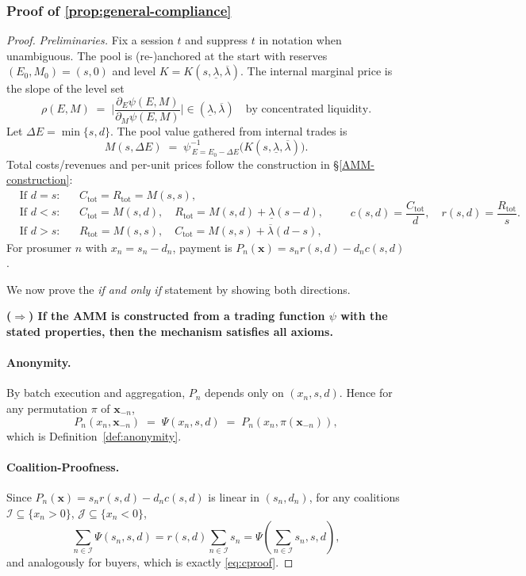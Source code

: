 \documentclass[12pt, notitlepage]{article}
\begin{document}
\subsubsection*{Proof of \cref{prop:general-compliance}}
\begin{proof}

\textit{Preliminaries.}
Fix a session \(t\) and suppress \(t\) in notation when unambiguous. The pool is (re-)anchored at the start with reserves \((E_0,M_0)=(s,0)\) and level \(K=K(s,\underline{\lambda},\overline{\lambda})\).
The internal marginal price is the slope of the level set
\[
\rho(E,M)\;=\;\biggl|\frac{\partial_E \psi(E,M)}{\partial_M \psi(E,M)}\biggr|
\in(\underline{\lambda},\overline{\lambda})
\quad\text{by concentrated liquidity.}
\]
Let \(\Delta E=\min\{s,d\}\). The pool value gathered from internal trades is
\[
M(s,\Delta E)\;=\;\psi^{-1}_{\,E=E_0-\Delta E}\!\bigl(K(s,\underline{\lambda},\overline{\lambda})\bigr).
\]
Total costs/revenues and per-unit prices follow the construction in \S\ref{AMM-construction}:
\[
\begin{aligned}
&\text{If }d=s: && C_{\mathrm{tot}}=R_{\mathrm{tot}}=M(s,s),\\
&\text{If }d<s: && C_{\mathrm{tot}}=M(s,d),\quad R_{\mathrm{tot}}=M(s,d)+\underline{\lambda}(s-d),\\
&\text{If }d>s: && R_{\mathrm{tot}}=M(s,s),\quad C_{\mathrm{tot}}=M(s,s)+\overline{\lambda}(d-s),
\end{aligned}
\qquad
c(s,d)=\frac{C_{\mathrm{tot}}}{d},\quad r(s,d)=\frac{R_{\mathrm{tot}}}{s}.
\]
For prosumer \(n\) with \(x_n=s_n-d_n\), payment is \(P_n(\bm{x})=s_n r(s,d)-d_n c(s,d)\).

We now prove the \emph{if and only if} statement by showing both directions.

\bigskip
\noindent\textbf{(\(\Rightarrow\)) If the AMM is constructed from a trading function \(\psi\) with the stated properties, then the mechanism satisfies all axioms.}

\paragraph{Anonymity.}
By batch execution and aggregation, \(P_n\) depends only on \((x_n,s,d)\). Hence for any permutation \(\pi\) of \(\bm{x}_{-n}\),
\[
P_n(x_n,\bm{x}_{-n}) \;=\; \Psi(x_n,s,d) \;=\; P_n(x_n,\pi(\bm{x}_{-n})),
\]
which is Definition~\ref{def:anonymity}.

\paragraph{Coalition-Proofness.}
Since \(P_n(\bm{x})=s_n r(s,d)-d_n c(s,d)\) is linear in \((s_n,d_n)\), for any coalitions \(\mathcal{I}\subseteq\{x_n>0\}\), \(\mathcal{J}\subseteq\{x_n<0\}\),
\[
\sum_{n\in\mathcal{I}}\!\Psi(s_n,s,d)
= r(s,d)\sum_{n\in\mathcal{I}}s_n
= \Psi\!\left(\sum_{n\in\mathcal{I}}s_n,s,d\right),
\]
and analogously for buyers, which is exactly \eqref{eq:cproof}.


\end{proof}
\end{document}
